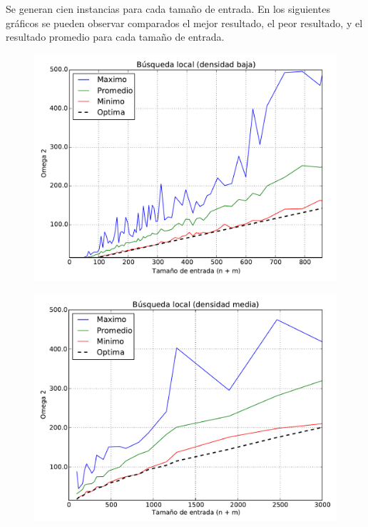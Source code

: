 Se generan cien instancias para cada tamaño de entrada. En los siguientes gráficos se pueden observar comparados el mejor resultado, el peor
resultado, y el resultado promedio para cada tamaño de entrada.

\begin{figure}[H]
\begin{center}
\includegraphics[angle=0, scale=.75]{imagenes/calidad_local_search_2014-06-27_16-02-57.pdf}
\label{grafico local}
\end{center}
\end{figure}

\begin{figure}[H]
\begin{center}
\includegraphics[angle=0, scale=.75]{imagenes/calidad_local_search_2014-06-27_08-58-52.pdf}
\label{grafico local}
\end{center}
\end{figure}

